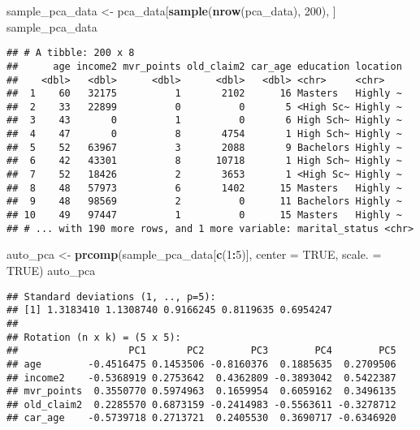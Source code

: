 \documentclass[]{article}
\newenvironment{Shaded}{\begin{snugshade}}{\end{snugshade}}
\newcommand{\KeywordTok}[1]{\textcolor[rgb]{0.13,0.29,0.53}{\textbf{#1}}}
\newcommand{\DataTypeTok}[1]{\textcolor[rgb]{0.13,0.29,0.53}{#1}}
\newcommand{\DecValTok}[1]{\textcolor[rgb]{0.00,0.00,0.81}{#1}}
\newcommand{\StringTok}[1]{\textcolor[rgb]{0.31,0.60,0.02}{#1}}
\newcommand{\OtherTok}[1]{\textcolor[rgb]{0.56,0.35,0.01}{#1}}
\newcommand{\OperatorTok}[1]{\textcolor[rgb]{0.81,0.36,0.00}{\textbf{#1}}}
\newcommand{\NormalTok}[1]{#1}
\begin{document}
\begin{Shaded}
\begin{Highlighting}[]
\NormalTok{sample_pca_data <-}\StringTok{ }\NormalTok{pca_data[}\KeywordTok{sample}\NormalTok{(}\KeywordTok{nrow}\NormalTok{(pca_data), }\DecValTok{200}\NormalTok{), ]}
\NormalTok{sample_pca_data}
\end{Highlighting}
\end{Shaded}

\begin{verbatim}
## # A tibble: 200 x 8
##      age income2 mvr_points old_claim2 car_age education location
##    <dbl>   <dbl>      <dbl>      <dbl>   <dbl> <chr>     <chr>   
##  1    60   32175          1       2102      16 Masters   Highly ~
##  2    33   22899          0          0       5 <High Sc~ Highly ~
##  3    43       0          1          0       6 High Sch~ Highly ~
##  4    47       0          8       4754       1 High Sch~ Highly ~
##  5    52   63967          3       2088       9 Bachelors Highly ~
##  6    42   43301          8      10718       1 High Sch~ Highly ~
##  7    52   18426          2       3653       1 <High Sc~ Highly ~
##  8    48   57973          6       1402      15 Masters   Highly ~
##  9    48   98569          2          0      11 Bachelors Highly ~
## 10    49   97447          1          0      15 Masters   Highly ~
## # ... with 190 more rows, and 1 more variable: marital_status <chr>
\end{verbatim}

\begin{Shaded}
\begin{Highlighting}[]
\NormalTok{auto_pca <-}\StringTok{ }\KeywordTok{prcomp}\NormalTok{(sample_pca_data[}\KeywordTok{c}\NormalTok{(}\DecValTok{1}\OperatorTok{:}\DecValTok{5}\NormalTok{)], }\DataTypeTok{center =} \OtherTok{TRUE}\NormalTok{, }\DataTypeTok{scale. =} \OtherTok{TRUE}\NormalTok{)}
\NormalTok{auto_pca}
\end{Highlighting}
\end{Shaded}

\begin{verbatim}
## Standard deviations (1, .., p=5):
## [1] 1.3183410 1.1308740 0.9166245 0.8119635 0.6954247
## 
## Rotation (n x k) = (5 x 5):
##                   PC1       PC2        PC3        PC4        PC5
## age        -0.4516475 0.1453506 -0.8160376  0.1885635  0.2709506
## income2    -0.5368919 0.2753642  0.4362809 -0.3893042  0.5422387
## mvr_points  0.3550770 0.5974963  0.1659954  0.6059162  0.3496135
## old_claim2  0.2285570 0.6873159 -0.2414983 -0.5563611 -0.3278712
## car_age    -0.5739718 0.2713721  0.2405530  0.3690717 -0.6346920
\end{verbatim}
\end{document}
